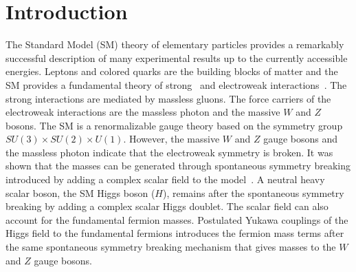 
\chapter{Introduction}

The Standard Model (SM) theory of elementary particles provides a remarkably successful description of many experimental results up to the currently accessible energies. Leptons and colored quarks are the building blocks of matter and the SM provides a fundamental theory of strong~\cite{Politzer:1973fx,Gross:1973id} and electroweak interactions~\cite{Glashow:1961tr,Weinberg:1967tq,Salam:1968rm}. The strong interactions are mediated by massless gluons. The force carriers of the electroweak interactions are the massless photon and the massive $W$ and $Z$ bosons. The SM is a renormalizable gauge theory based on the symmetry group $SU(3) \times SU(2) \times U(1)$. However, the massive $W$ and $Z$ gauge bosons and the massless photon indicate that the electroweak symmetry is broken. It was shown that the masses can be generated through spontaneous symmetry breaking introduced by adding a complex scalar field to the model~\cite{Englert:1964et,Higgs:1964ia,Higgs:1964pj,Guralnik:1964eu,Higgs:1966ev,Kibble:1967sv}. A neutral heavy scalar boson, the SM Higgs boson ($H$), remains after the spontaneous symmetry breaking by adding a complex scalar Higgs doublet. The scalar field can also account for the fundamental fermion masses. Postulated Yukawa couplings of the Higgs field to the fundamental fermions introduces the fermion mass terms after the same spontaneous symmetry breaking mechanism that gives masses to the $W$ and $Z$ gauge bosons. 

